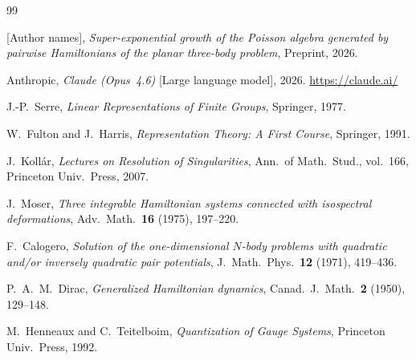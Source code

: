 \documentclass[11pt,a4paper]{article}
\theoremstyle{remark}
\begin{document}
\begin{thebibliography}{99}

[Author names],
\emph{Super-exponential growth of the Poisson algebra
generated by pairwise Hamiltonians of the planar
three-body problem},
Preprint, 2026.

Anthropic,
\emph{Claude (Opus~4.6)} [Large language model], 2026.
\url{https://claude.ai/}

J.-P.~Serre,
\emph{Linear Representations of Finite Groups},
Springer, 1977.

W.~Fulton and J.~Harris,
\emph{Representation Theory: A First Course},
Springer, 1991.

J.~Koll\'{a}r,
\emph{Lectures on Resolution of Singularities},
Ann.\ of Math.\ Stud., vol.\ 166, Princeton Univ.\
Press, 2007.

J.~Moser,
\emph{Three integrable Hamiltonian systems connected with
isospectral deformations},
Adv.\ Math.\ \textbf{16} (1975), 197--220.

F.~Calogero,
\emph{Solution of the one-dimensional $N$-body problems
with quadratic and/or inversely quadratic pair potentials},
J.~Math.\ Phys.\ \textbf{12} (1971), 419--436.

P.~A.~M.~Dirac,
\emph{Generalized Hamiltonian dynamics},
Canad.\ J.~Math.\ \textbf{2} (1950), 129--148.

M.~Henneaux and C.~Teitelboim,
\emph{Quantization of Gauge Systems},
Princeton Univ.\ Press, 1992.

\end{thebibliography}
\end{document}
